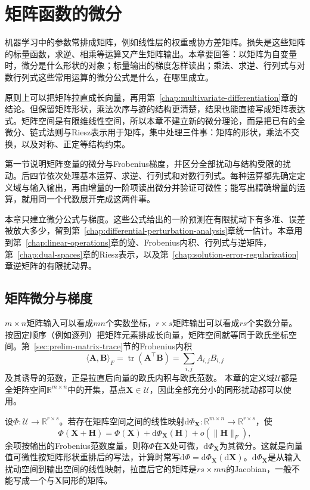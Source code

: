 \chapter{矩阵函数的微分}
\label{sec:multivariable-matrix-perturbation}
\label{sec:multivariable-matrix-differentiation}
\label{chap:matrix-differentiation}

机器学习中的参数常排成矩阵，例如线性层的权重或协方差矩阵。损失是这些矩阵的标量函数，求逆、相乘等运算又产生矩阵输出。本章要回答：以矩阵为自变量时，微分是什么形状的对象；标量输出的梯度怎样读出；乘法、求逆、行列式与对数行列式这些常用运算的微分公式是什么，在哪里成立。

原则上可以把矩阵拉直成长向量，再用第~\ref{chap:multivariate-differentiation}章的结论。但保留矩阵形状，乘法次序与迹的结构更清楚，结果也能直接写成矩阵表达式。矩阵空间是有限维线性空间，所以本章不建立新的微分理论，而是把已有的全微分、链式法则与Riesz表示用于矩阵，集中处理三件事：矩阵的形状，乘法不交换，以及对称、正定等结构约束。

第一节说明矩阵变量的微分与Frobenius梯度，并区分全部扰动与结构受限的扰动。后四节依次处理基本运算、求逆、行列式和对数行列式。每种运算都先确定定义域与输入输出，再由增量的一阶项读出微分并验证可微性；能写出精确增量的运算，就用同一个代数展开完成这两件事。

本章只建立微分公式与梯度。这些公式给出的一阶预测在有限扰动下有多准、误差被放大多少，留到第~\ref{chap:differential-perturbation-analysis}章统一估计。本章用到第~\ref{chap:linear-operations}章的迹、Frobenius内积、行列式与逆矩阵，第~\ref{chap:dual-spaces}章的Riesz表示，以及第~\ref{chap:solution-error-regularization}章逆矩阵的有限扰动界。

\section{矩阵微分与梯度}
\label{sec:multivariable-matrix-variable-gradient}

$m\times n$矩阵输入可以看成$mn$个实数坐标，$r\times s$矩阵输出可以看成$rs$个实数分量。按固定顺序（例如逐列）把矩阵元素排成长向量，矩阵空间就等同于欧氏坐标空间。第~\ref{sec:prelim-matrix-trace}节的Frobenius内积
\[
 \langle\bm A,\bm B\rangle_F=\operatorname{tr}(\bm A^\top\bm B)=\sum_{i,j}A_{i,j}B_{i,j}
\]
及其诱导的范数，正是拉直后向量的欧氏内积与欧氏范数。
本章的定义域$\mathcal U$都是全矩阵空间$\mathbb R^{m\times n}$中的开集，基点$\bm X\in\mathcal U$，因此全部充分小的同形扰动都可以使用。

设$\Phi:\mathcal U\to\mathbb R^{r\times s}$。若存在矩阵空间之间的线性映射$\mathrm d\Phi_{\bm X}:\mathbb R^{m\times n}\to\mathbb R^{r\times s}$，使
\begin{equation}
 \Phi(\bm X+\bm H)=\Phi(\bm X)+\mathrm d\Phi_{\bm X}(\bm H)+o(\lVert\bm H\rVert_F),
\label{eq:multivariable-matrix-differential-definition}
\end{equation}
余项按输出的Frobenius范数度量，则称$\Phi$在$\bm X$处可微，$\mathrm d\Phi_{\bm X}$为其微分。这就是向量值可微性按矩阵形状重排后的写法，计算时常写$\mathrm d\Phi=\mathrm d\Phi_{\bm X}(\mathrm d\bm X)$。$\mathrm d\Phi_{\bm X}$是从输入扰动空间到输出空间的线性映射，拉直后它的矩阵是$rs\times mn$的Jacobian，一般不能写成一个与$\bm X$同形的矩阵。

